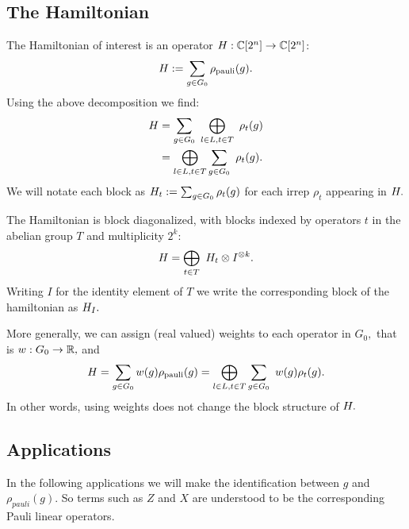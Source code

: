 \documentclass[12pt]{article}
\renewenvironment{framed}[1][\hsize]{%
\def\FrameCommand{{\color{black}\vrule width 3pt}\hspace{0pt}\fboxsep=\FrameSep\colorbox{lightgray}}%
\MakeFramed{\hsize0.8\linewidth\advance\hsize-\width\FrameRestore}}
{\endMakeFramed}
\begin{document}
\subsection{The Hamiltonian}

The Hamiltonian of interest is 
an operator $H:\mathbb{C}[2^n]\to\mathbb{C}[2^n]$:
$$ H := \sum_{g\in G_0} \rho_{\mathrm{pauli}}(g).$$
Using the above decomposition we find:
\begin{align*}
    H &= \sum_{g\in G_0}\ \bigoplus_{l\in L, t\in T}\ \rho_t(g)\\
         &= \bigoplus_{l\in L, t\in T} \sum_{g\in G_0}\ \rho_t(g).
\end{align*}
We will notate each block as
$H_t := \sum_{g\in G_0}\rho_t(g)$
for each irrep $\rho_t$ appearing in $H.$
\begin{framed}

The Hamiltonian is block diagonalized, with blocks indexed by operators $t$ in
the abelian group $T$ and multiplicity $2^k:$
$$
    H =  \bigoplus_{t\in T}\ H_t \otimes I^{\otimes k}.
$$
\end{framed}
Writing $I$ for the identity element of $T$ we write the corresponding
block of the hamiltonian as $H_I.$

More generally, we can assign (real valued) weights
to each operator in $G_0,$ that is
$w:G_0\to\mathbb{R},$
and 
\begin{align*}
    H = \sum_{g\in G_0} w(g) \rho_{\mathrm{pauli}}(g)
            = \bigoplus_{l\in L, t\in T} \sum_{g\in G_0}\ w(g) \rho_t(g).
\end{align*}
In other words, using weights does not change the block structure of $H.$

%
%

\subsection{Applications}

In the following applications we will make the identification
between $g$ and $\rho_{pauli}(g)$.
So terms such as $Z$ and $X$ are understood
to be the corresponding Pauli linear operators.
\end{document}
